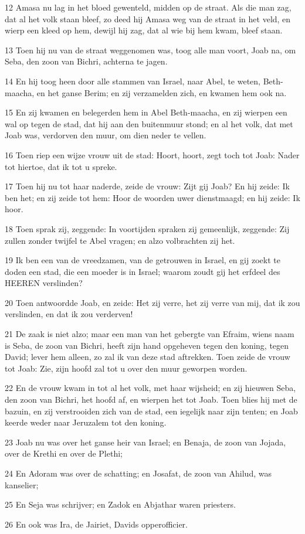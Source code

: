 \par 12 Amasa nu lag in het bloed gewenteld, midden op de straat. Als die man zag, dat al het volk staan bleef, zo deed hij Amasa weg van de straat in het veld, en wierp een kleed op hem, dewijl hij zag, dat al wie bij hem kwam, bleef staan.
\par 13 Toen hij nu van de straat weggenomen was, toog alle man voort, Joab na, om Seba, den zoon van Bichri, achterna te jagen.
\par 14 En hij toog heen door alle stammen van Israel, naar Abel, te weten, Beth-maacha, en het ganse Berim; en zij verzamelden zich, en kwamen hem ook na.
\par 15 En zij kwamen en belegerden hem in Abel Beth-maacha, en zij wierpen een wal op tegen de stad, dat hij aan den buitenmuur stond; en al het volk, dat met Joab was, verdorven den muur, om dien neder te vellen.
\par 16 Toen riep een wijze vrouw uit de stad: Hoort, hoort, zegt toch tot Joab: Nader tot hiertoe, dat ik tot u spreke.
\par 17 Toen hij nu tot haar naderde, zeide de vrouw: Zijt gij Joab? En hij zeide: Ik ben het; en zij zeide tot hem: Hoor de woorden uwer dienstmaagd; en hij zeide: Ik hoor.
\par 18 Toen sprak zij, zeggende: In voortijden spraken zij gemeenlijk, zeggende: Zij zullen zonder twijfel te Abel vragen; en alzo volbrachten zij het.
\par 19 Ik ben een van de vreedzamen, van de getrouwen in Israel, en gij zoekt te doden een stad, die een moeder is in Israel; waarom zoudt gij het erfdeel des HEEREN verslinden?
\par 20 Toen antwoordde Joab, en zeide: Het zij verre, het zij verre van mij, dat ik zou verslinden, en dat ik zou verderven!
\par 21 De zaak is niet alzo; maar een man van het gebergte van Efraim, wiens naam is Seba, de zoon van Bichri, heeft zijn hand opgeheven tegen den koning, tegen David; lever hem alleen, zo zal ik van deze stad aftrekken. Toen zeide de vrouw tot Joab: Zie, zijn hoofd zal tot u over den muur geworpen worden.
\par 22 En de vrouw kwam in tot al het volk, met haar wijsheid; en zij hieuwen Seba, den zoon van Bichri, het hoofd af, en wierpen het tot Joab. Toen blies hij met de bazuin, en zij verstrooiden zich van de stad, een iegelijk naar zijn tenten; en Joab keerde weder naar Jeruzalem tot den koning.
\par 23 Joab nu was over het ganse heir van Israel; en Benaja, de zoon van Jojada, over de Krethi en over de Plethi;
\par 24 En Adoram was over de schatting; en Josafat, de zoon van Ahilud, was kanselier;
\par 25 En Seja was schrijver; en Zadok en Abjathar waren priesters.
\par 26 En ook was Ira, de Jairiet, Davids opperofficier.

